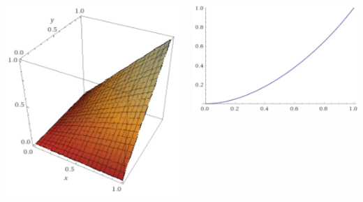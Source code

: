\documentclass{beamer}
\begin{document}
\begin{frame}
\begin{columns}
\begin{minipage}[c][0.4\textheight][c]{\linewidth}
  \includegraphics[width=0.5\linewidth]{FT/FT0_5}
\end{minipage}
\begin{minipage}[c][0.4\textheight][c]{\linewidth}
  \centering
  \includegraphics[width=0.7\linewidth]{FT/FT0_5-diag}
\end{minipage}
\end{columns}
\end{frame}
\end{document}
